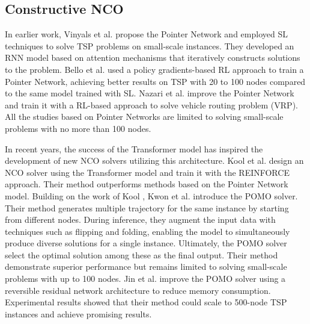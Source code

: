 \subsection{Constructive NCO}

In earlier work, Vinyals et al. \cite{vinyals2015pointer} propose the Pointer Network and employed SL techniques to solve TSP problems on small-scale instances. They developed an RNN model based on attention mechanisms that iteratively constructs solutions to the problem.
Bello et al. \cite{bello2016neural} used a policy gradients-based RL approach to train a Pointer Network, achieving better results on TSP with 20 to 100 nodes compared to the same model trained with SL.
Nazari et al. \cite{nazari2018reinforcement} improve the Pointer Network and train it with a RL-based approach to solve vehicle routing problem (VRP).
All the studies based on Pointer Networks are limited to solving small-scale problems with no more than 100 nodes.

In recent years, the success of the Transformer model \cite{vaswani2017attention} has inspired the development of new NCO solvers utilizing this architecture.
Kool et al. \cite{kool2018attention} design an NCO solver using the Transformer model and train it with the REINFORCE approach. Their method outperforms methods based on the Pointer Network model.
Building on the work of Kool \cite{kool2018attention}, Kwon et al. \cite{kwon2020pomo} introduce the POMO solver. Their method generates multiple trajectory for the same instance by starting from different nodes. During inference, they augment the input data with techniques such as flipping and folding, enabling the model to simultaneously produce diverse solutions for a single instance. Ultimately, the POMO solver select the optimal solution among these as the final output. Their method demonstrate superior performance but remains limited to solving small-scale problems with up to 100 nodes.
Jin et al. \cite{jin2023pointerformer} improve the POMO solver using a reversible residual network architecture to reduce memory consumption. Experimental results showed that their method could scale to 500-node TSP instances and achieve promising results.

